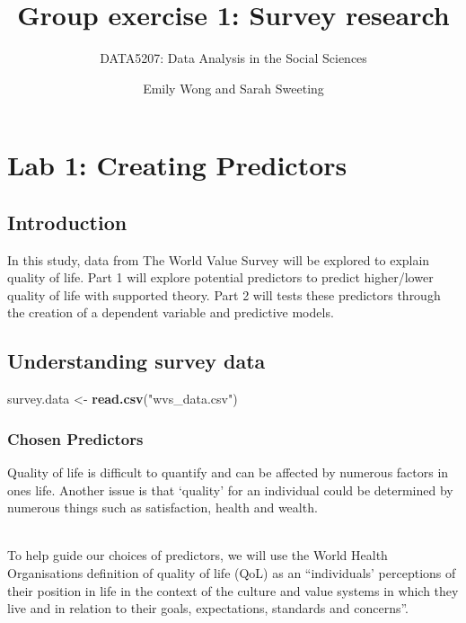 \documentclass[
]{article}
\title{Group exercise 1: Survey research}
\subtitle{DATA5207: Data Analysis in the Social Sciences}
\author{Emily Wong and Sarah Sweeting}
\date{}
\newenvironment{Shaded}{\begin{snugshade}}{\end{snugshade}}
\newcommand{\FunctionTok}[1]{\textcolor[rgb]{0.13,0.29,0.53}{\textbf{#1}}}
\newcommand{\NormalTok}[1]{#1}
\newcommand{\OtherTok}[1]{\textcolor[rgb]{0.56,0.35,0.01}{#1}}
\newcommand{\StringTok}[1]{\textcolor[rgb]{0.31,0.60,0.02}{#1}}
\begin{document}
\maketitle

\hypertarget{lab-1-creating-predictors}{%
\section{Lab 1: Creating Predictors}\label{lab-1-creating-predictors}}

\hypertarget{introduction}{%
\subsection{Introduction}\label{introduction}}

In this study, data from The World Value Survey will be explored to
explain quality of life. Part 1 will explore potential predictors to
predict higher/lower quality of life with supported theory. Part 2 will
tests these predictors through the creation of a dependent variable and
predictive models.

\hypertarget{understanding-survey-data}{%
\subsection{Understanding survey data}\label{understanding-survey-data}}

\begin{Shaded}
\begin{Highlighting}[]
\NormalTok{survey.data }\OtherTok{\textless{}{-}} \FunctionTok{read.csv}\NormalTok{(}\StringTok{"wvs\_data.csv"}\NormalTok{)}
\end{Highlighting}
\end{Shaded}

\hypertarget{chosen-predictors}{%
\subsubsection{Chosen Predictors}\label{chosen-predictors}}

Quality of life is difficult to quantify and can be affected by numerous
factors in ones life. Another issue is that `quality' for an individual
could be determined by numerous things such as satisfaction, health and
wealth.\\
\strut \\
To help guide our choices of predictors, we will use the World Health
Organisations definition of quality of life (QoL) as an ``individuals'
perceptions of their position in life in the context of the culture and
value systems in which they live and in relation to their goals,
expectations, standards and concerns''.
\end{document}
